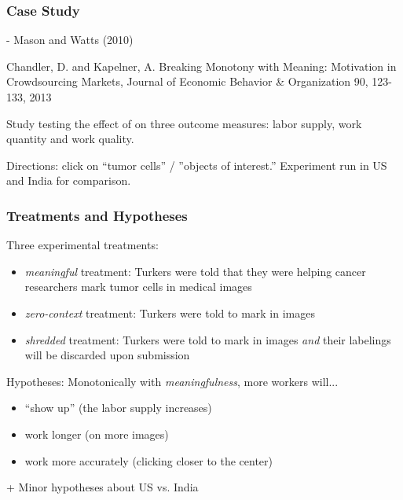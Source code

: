 \documentclass[slides]{beamer} %
\begin{document}
\begin{frame}\frametitle{Case Study}
\scriptsize 

 - Mason and Watts (2010) \pause

\begin{thebibliography}{1}
\tiny
Chandler, D. and Kapelner, A. Breaking Monotony with Meaning: Motivation in Crowdsourcing Markets, Journal of Economic Behavior \& Organization 90, 123-133, 2013
\end{thebibliography}

\scriptsize 
\vspace{0.2cm}
Study testing the effect of  on three outcome measures: labor supply, work quantity and work quality. \\ \pause

\scriptsize
Directions: click on ``tumor cells'' / ''objects of interest.'' \pause Experiment run in US and India for comparison. 

\vspace{-0.2cm}

\end{frame}

\begin{frame}\frametitle{Treatments and Hypotheses}

Three experimental treatments: \pause

\begin{itemize}
\item \textit{meaningful} treatment: Turkers were told that they were helping cancer researchers mark tumor cells in medical images \pause
\item \textit{zero-context} treatment: Turkers were told to mark  in images \pause
\item \textit{shredded} treatment: Turkers were told to mark  in images \textit{and} their labelings will be discarded upon submission \pause
\end{itemize}

Hypotheses: Monotonically with \textit{meaningfulness}, more workers will... \pause

\begin{itemize}
\item ``show up'' (\ie the labor supply increases) \pause
\item work longer (\ie on more images) \pause
\item work more accurately (\ie clicking closer to the center) \pause
\end{itemize}

\scriptsize

+ Minor hypotheses about US vs. India

\end{frame}
\end{document}

